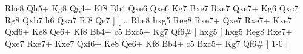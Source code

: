 Rhe8  Qh5+ Kg8  Qg4+ Kf8  Bb4 Qxe6  Qxe6 Kg7  Bxe7 Rxe7  Qxe7+ Kg6  Qxc7 Rg8  Qxb7 h6  Qxa7 Rf8  Qe7   ]  [ .. Rbe8  hxg5 Reg8  Rxe7+ Qxe7  Rxe7+ Kxe7  Qxf6+ Ke8  Qe6+ Kf8  Bb4+ c5  Bxc5+ Kg7  Qf6#   ]  hxg5    [  hxg5 Reg8  Rxe7+ Qxe7  Rxe7+ Kxe7  Qxf6+ Ke8  Qe6+ Kf8  Bb4+ c5  Bxc5+ Kg7  Qf6#   ] 1-0  |
